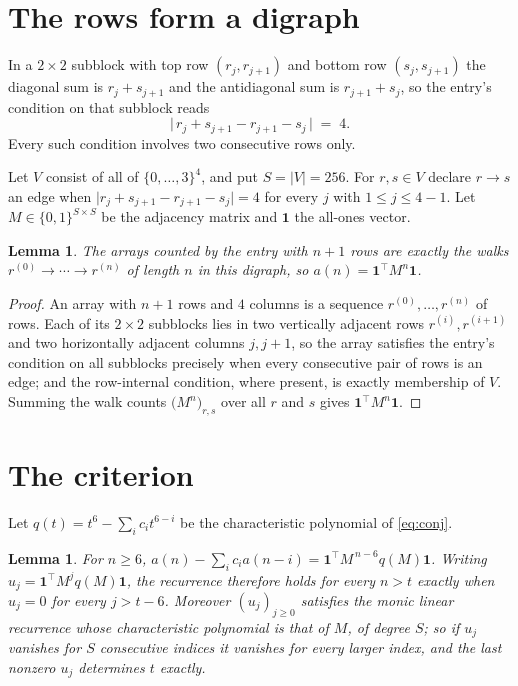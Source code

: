 \documentclass[11pt,a4paper]{article}
\theoremstyle{plain}
\newtheorem{lemma}[theorem]{Lemma}
\theoremstyle{definition}
\begin{document}
\section{The rows form a digraph}

In a $2\times2$ subblock with top row $(r_j,r_{j+1})$ and bottom row $(s_j,s_{j+1})$ the
diagonal sum is $r_j+s_{j+1}$ and the antidiagonal sum is $r_{j+1}+s_j$, so the entry's
condition on that subblock reads
\[
\bigl|\,r_j+s_{j+1}-r_{j+1}-s_j\,\bigr|\;=\;4.
\]
Every such condition involves two consecutive rows only.

Let $V$ consist of all of $\{0,\dots,3\}^{4}$, and put $S=|V|=256$. For $r,s\in V$ declare $r\to s$ an edge
when $\bigl|r_j+s_{j+1}-r_{j+1}-s_j\bigr|=4$ for every $j$ with
$1\le j\le4-1$. Let $M\in\{0,1\}^{S\times S}$ be the adjacency matrix and $\mathbf{1}$
the all-ones vector.

\begin{lemma}\label{lem:walk}
The arrays counted by the entry with $n+1$ rows are exactly the walks
$r^{(0)}\to\cdots\to r^{(n)}$ of length $n$ in this digraph, so
$a(n)=\mathbf{1}^{\!\top}M^{n}\mathbf{1}$.
\end{lemma}

\begin{proof}
An array with $n+1$ rows and $4$ columns is a sequence $r^{(0)},\dots,r^{(n)}$ of
rows. Each of its $2\times2$ subblocks lies in two vertically adjacent rows
$r^{(i)},r^{(i+1)}$ and two horizontally adjacent columns $j,j+1$, so the array satisfies
the entry's condition on all subblocks precisely when every consecutive pair of rows is an
edge; and the row-internal condition, where present, is exactly membership of $V$. Summing
the walk counts $\bigl(M^{n}\bigr)_{r,s}$ over all $r$ and $s$ gives
$\mathbf{1}^{\!\top}M^{n}\mathbf{1}$.
\end{proof}

\section{The criterion}

Let $q(t)=t^{6}-\sum_i c_i t^{6-i}$ be the characteristic polynomial of
\eqref{eq:conj}.

\begin{lemma}\label{lem:crit}
For $n\ge6$,
$a(n)-\sum_i c_i a(n-i)=\mathbf{1}^{\!\top}M^{\,n-6}q(M)\mathbf{1}$. Writing
$u_j=\mathbf{1}^{\!\top}M^{j}q(M)\mathbf{1}$, the recurrence therefore holds for every
$n>t$ exactly when $u_j=0$ for every $j>t-6$. Moreover $(u_j)_{j\ge0}$ satisfies the
monic linear recurrence whose characteristic polynomial is that of $M$, of degree $S$; so
if $u_j$ vanishes for $S$ consecutive indices it vanishes for every larger index, and the
last nonzero $u_j$ determines $t$ exactly.
\end{lemma}
\end{document}
